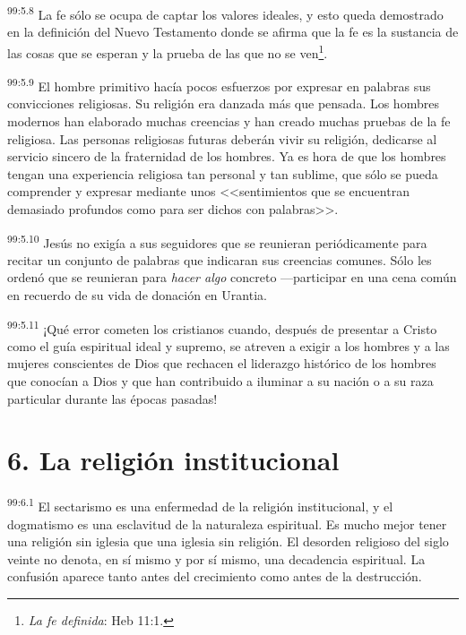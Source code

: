 \documentclass[twoside, 11pt]{book}
\begin{document}
\par
\textsuperscript{99:5.8} La fe sólo se ocupa de captar los valores ideales, y esto queda demostrado en la definición del Nuevo Testamento donde se afirma que la fe es la sustancia de las cosas que se esperan y la prueba de las que no se ven\footnote{\textit{La fe definida}: Heb 11:1.}.

\par
\textsuperscript{99:5.9} El hombre primitivo hacía pocos esfuerzos por expresar en palabras sus convicciones religiosas. Su religión era danzada más que pensada. Los hombres modernos han elaborado muchas creencias y han creado muchas pruebas de la fe religiosa. Las personas religiosas futuras deberán vivir su religión, dedicarse al servicio sincero de la fraternidad de los hombres. Ya es hora de que los hombres tengan una experiencia religiosa tan personal y tan sublime, que sólo se pueda comprender y expresar mediante unos <<sentimientos que se encuentran demasiado profundos como para ser dichos con palabras>>.

\par
\textsuperscript{99:5.10} Jesús no exigía a sus seguidores que se reunieran periódicamente para recitar un conjunto de palabras que indicaran sus creencias comunes. Sólo les ordenó que se reunieran para \textit{hacer algo} concreto ---participar en una cena común en recuerdo de su vida de donación en Urantia.

\par
\textsuperscript{99:5.11} ¡Qué error cometen los cristianos cuando, después de presentar a Cristo como el guía espiritual ideal y supremo, se atreven a exigir a los hombres y a las mujeres conscientes de Dios que rechacen el liderazgo histórico de los hombres que conocían a Dios y que han contribuido a iluminar a su nación o a su raza particular durante las épocas pasadas!

\section*{6. La religión institucional}
\par
\textsuperscript{99:6.1} El sectarismo es una enfermedad de la religión institucional, y el dogmatismo es una esclavitud de la naturaleza espiritual. Es mucho mejor tener una religión sin iglesia que una iglesia sin religión. El desorden religioso del siglo veinte no denota, en sí mismo y por sí mismo, una decadencia espiritual. La confusión aparece tanto antes del crecimiento como antes de la destrucción.
\end{document}
